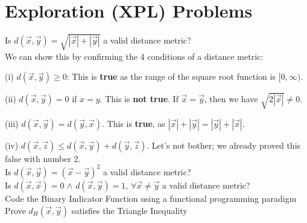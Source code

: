 \section{Exploration (XPL) Problems}

\begin{outline}[enumerate]

\1  Is $d(\vec{x},\vec{y}) = \sqrt{|\vec{x}| + |\vec{y}|}$ a valid distance metric? \\

We can show this by confirming the 4 conditions of a distance metric:

(i) $d(\vec{x},\vec{y}) \ge 0$: This is \textbf{true} as the range of the square root function is $[0,\infty)$.

(ii) $d(\vec{x},\vec{y}) = 0$ if $x=y$. This is \textbf{not true}. If $\vec{x}=\vec{y}$, then we have $\sqrt{2|\vec{x}|} \neq 0$.

(iii) $d(\vec{x},\vec{y}) = d(\vec{y},\vec{x})$. This is \textbf{true}, as $|\vec{x}| + |\vec{y}| = |\vec{y}| + |\vec{x}|$.

(iv) $d(\vec{x},\vec{z}) \leq d(\vec{x},\vec{y}) + d(\vec{y},\vec{z})$. Let's not bother; we already proved this false with number 2. \\


\1  Is $d(\vec{x},\vec{y}) = (\vec{x} - \vec{y})^2$ a valid distance metric? \\

\1 Is $d(\vec{x},\vec{x}) = 0$ $\wedge$ $d(\vec{x},\vec{y}) = 1$, $\forall \vec{x} \neq \vec{y}$ a valid distance metric? \\

\1  Code the Binary Indicator Function using a functional programming paradigm \\

\1 Prove $d_H(\vec{x},\vec{y})$ satisfies the Triangle Inequality
\end{outline}
